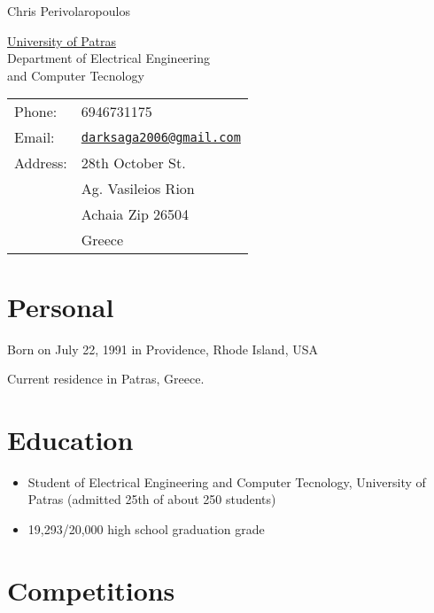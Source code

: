 \documentclass[letterpaper]{article}
\makeatletter
\def\name{Chris Perivolaropoulos}
\def\mail{darksaga2006@gmail.com}
\makeatother
\begin{document}
{\huge \name}


\vspace{0.25in}

\begin{minipage}{0.45\linewidth}
  \href{http://www.upartas.gr/}{University of Patras} \\
  Department of Electrical Engineering\\ and Computer Tecnology \\
\end{minipage}
\begin{minipage}{0.45\linewidth}
  \begin{tabular}{ll}
    Phone:   & 6946731175 \\
    Email:   & \href{mailto:\mail}{\tt \mail} \\
    Address: & 28th October St.\\
    & Ag. Vasileios Rion \\
    &Achaia Zip 26504 \\
    &Greece\\
  \end{tabular}
\end{minipage}


\section*{Personal}

\begin{list}{}{\setlength{\leftmargin}{1.5em}}
\item Born on July 22, 1991 in Providence, Rhode Island, USA
\item Current residence in Patras, Greece.
\end{list}


\section*{Education}

\begin{itemize}
\item Student of Electrical Engineering and Computer Tecnology,
  University of Patras (admitted 25th of about 250 students)
\item 19,293/20,000 high school graduation grade
\end{itemize}

\section*{Competitions}
\end{document}
